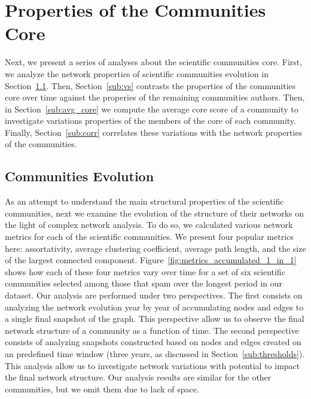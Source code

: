 \section{Properties of the Communities Core}

Next, we present a series of analyses about the scientific communities core. First, we analyze the network properties of scientific communities evolution in Section~\ref{sub:time}.
Then, Section~\ref{sub:vs} contrasts the properties of the communities core over time against the properies of the remaining communities authors. Then, in
Section~\ref{sub:avg_core} we compute the average core score of a community to investigate variations properties of the members of the core of each community. Finally,
Section~\ref{sub:corr} correlates these variations with the network properties of the communities. 


\subsection{Communities Evolution}
\label{sub:time}

As an attempt to understand the main structural properties of the scientific communities, next we examine the evolution of the structure of their networks on the light of complex
network analysis. To do so, we calculated various network metrics for each of the scientific communities. We present four popular metrics here: assortativity, average clustering
coefficient, average path length, and the size of the largest connected component.  Figure~\ref{fig:metrics_accumulated_1_in_1} shows how each of these four metrics vary over time
for a set of six scientific communities selected among those that spam over the longest period in our dataset.  Our analysis are performed under two perspectives. The first
consists on analyzing the network evolution year by year of accumulating nodes and edges to a single final snapshot of the graph. This perspective allow us to observe the final
network structure of a community as a function of time. The second perspective consists of analyzing snapshots constructed based on nodes and edges created on an predefined time
window (three years, as discussed in Section~\ref{sub:thresholds}). This analysis allow us to investigate network variations with potential to impact the final network structure.
Our analysis results are similar for the other communities, but we omit
them due to lack of space.

